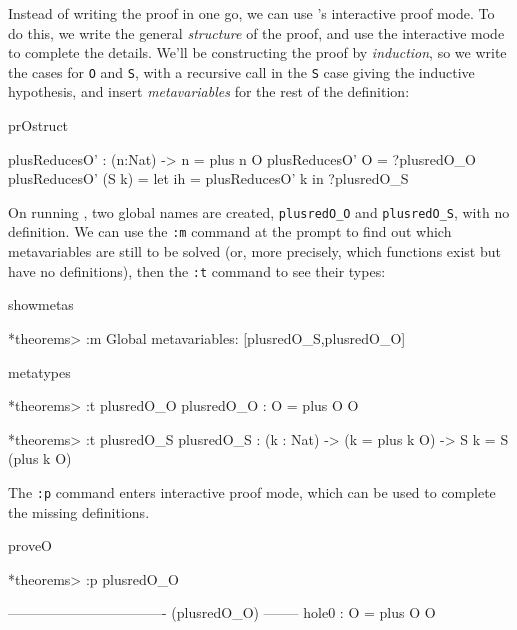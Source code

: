Instead of writing the proof in one go, we can use \Idris{}'s interactive
proof mode. To do this, we write the general \emph{structure} of the proof,
and use the interactive mode to complete the details. We'll be constructing
the proof by \emph{induction}, so we write the cases for \texttt{O} and
\texttt{S}, with a recursive call in the \texttt{S} case giving the inductive
hypothesis, and insert \emph{metavariables} for the rest of the definition:

\begin{SaveVerbatim}{prOstruct}

plusReducesO' : (n:Nat) -> n = plus n O
plusReducesO' O     = ?plusredO_O
plusReducesO' (S k) = let ih = plusReducesO' k in
                      ?plusredO_S

\end{SaveVerbatim}

\noindent
On running \Idris{}, two global names are created, \texttt{plusredO\_O} and
\texttt{plusredO\_S}, with no definition. We can use the \texttt{:m} command
at the prompt to find out which metavariables are still to be solved (or, more
precisely, which functions exist but have no definitions), then the
\texttt{:t} command to see their types:

\begin{SaveVerbatim}{showmetas}

*theorems> :m 
Global metavariables:
        [plusredO_S,plusredO_O]

\end{SaveVerbatim}

\begin{SaveVerbatim}{metatypes}

*theorems> :t plusredO_O 
plusredO_O : O = plus O O

*theorems> :t plusredO_S 
plusredO_S : (k : Nat) -> (k = plus k O) -> S k = S (plus k O)

\end{SaveVerbatim}


\noindent
The \texttt{:p} command enters interactive proof mode, which can be used to complete
the missing definitions.

\begin{SaveVerbatim}{proveO}

*theorems> :p plusredO_O

---------------------------------- (plusredO_O) --------
{hole0} : O = plus O O

\end{SaveVerbatim}

